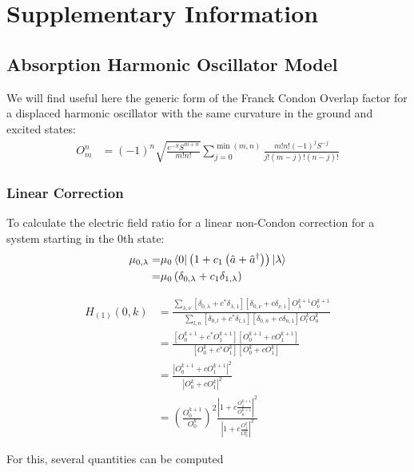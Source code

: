\section{Supplementary Information}
\subsection{Absorption Harmonic Oscillator Model}
We will find useful here the generic form of the Franck Condon Overlap factor for a displaced harmonic oscillator with the same curvature in the ground and excited states:
\begin{align}
	O_{m}^{n} &= \left(-1\right)^{n} \sqrt{\frac{e^{-S}S^{m+n}}{m!n!}} \sum_{j=0}^{\min \left( m,n\right)} \frac{m!n!(-1)^j S^{-j}}{j!(m-j)!(n-j)!}
	\label{eqn:overlap}
\end{align}
\subsubsection{Linear Correction}
To calculate the electric field ratio for a linear non-Condon correction for a system starting in the 0th state:
\begin{align*}
	\mu_{0,\lambda} =& \mu_0 \bra{0} \left( 1 + c_1\left(\hat{a} + \hat{a}^{\dagger}\right) \right) \ket{\lambda} \\
	=& \mu_0\left( \delta_{0,\lambda} + c_1 \delta_{1, \lambda}\right)
\end{align*}

\begin{align}
	H_{(1)}(0,k) &=\frac{\sum_{\lambda,\nu} \left[ \delta_{0,\lambda} + c^*\delta_{\lambda, 1} \right]\left[ \delta_{0,\nu} + c \delta_{\nu, 1} \right]   O_{\lambda}^{k+1} O_{\nu}^{k+1} }{\sum_{l,n} \left[ \delta_{0,l} + c^*\delta_{l, 1} \right]\left[ \delta_{0,n} + c \delta_{n, 1} \right]   O_{l}^{k} O_{n}^{k} }\\
	&= \frac{ \left[ O_{0}^{k+1} + c^*O_{1}^{k+1} \right]\left[ O_{0}^{k+1} + c O_{1}^{k+1} \right]   }{\left[ O_{0}^{k} + c^*O_{1}^{k} \right]\left[ O_{0}^{k} + c O_{1}^{k}\right]     } \\
	&=  \frac{\left| O_{0}^{k+1} + cO_{1}^{k+1}  \right|^2 }{\left|O_{0}^{k} + cO_{1}^{k} \right|^2} \\
	&= \left(\frac{O_{0}^{k+1}}{O_{0}^{k}} \right)^2   \frac{ \left|1 + c\frac{O_{1}^{k+1}}{O_{0}^{k+1}}  \right|^2}{\left|1 + c\frac{O_{1}^{k} }{O_{0}^{k}}\right|^2}
\end{align}

For this, several quantities can be computed

